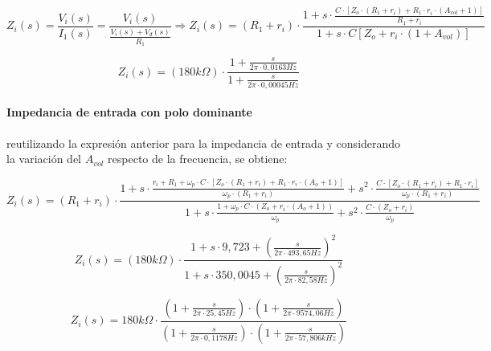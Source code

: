 \begin{equation*}
	Z_i(s) = \frac{V_i(s)}{I_1(s)} = \frac{V_i(s)}{\frac{V_i(s) + V_d(s)}{R_1}}
	\Rightarrow
	Z_i(s) = (R_1 + r_i) \cdot \frac{1 + s \cdot \frac{C \cdot \left[ Z_o \cdot (R_1 + r_i) + R_1 \cdot r_i \cdot (A_{vol} + 1) \right]}{R_1 + r_i}}{1 + s \cdot C \left[ Z_o + r_i \cdot ( 1 + A_{vol}) \right]}
\end{equation*}

\begin{equation}
	Z_i(s) = (180k \Omega) \cdot \frac{1 + \frac{s}{2 \pi \cdot 0,0163Hz}}{1 + \frac{s}{2 \pi \cdot 0,00045Hz}}
	\label{eq:integrador_impedancia_avol_finito}
\end{equation}

\paragraph*{Impedancia de entrada con polo dominante} reutilizando la expresi\'on anterior para la impedancia de entrada y considerando la variaci\'on del $A_{vol}$ respecto de la frecuencia, se obtiene:

\begin{equation*}
	Z_i(s) = (R_1 + r_i) \cdot \frac{1 + s \cdot \frac{r_i + R_1 + \omega_p \cdot C \cdot \left[ Z_o \cdot ( R_1 + r_i ) + R_1 \cdot r_i \cdot (A_o + 1) \right]}{\omega_p \cdot (R_1 +r_i)} + s^{2} \cdot \frac{C \cdot \left[ Z_o \cdot (R_1 + r_i) + R_1 \cdot r_i \right]}{\omega_p \cdot (R_1 + r_i)}}{1 + s \cdot \frac{1 + \omega_p \cdot C \cdot (Z_o + r_i \cdot ( A_o + 1 ) )}{\omega_p} + s^{2} \cdot \frac{C \cdot(Z_o + r_i)}{\omega_p}}
\end{equation*}

\begin{equation*}
	Z_i(s) = (180k \Omega) \cdot \frac{1 + s \cdot 9,723 + \left( \frac{s}{2 \pi \cdot 493,65Hz} \right)^{2}	}{1 + s \cdot 350,0045 + \left(\frac{s}{2 \pi \cdot 82,58Hz} \right)^{2}}
\end{equation*}

\begin{equation}
	Z_i(s) = 180k \Omega \cdot \frac{(1 + \frac{s}{2 \pi \cdot 25,45Hz}) \cdot (1 + \frac{s}{2 \pi \cdot 9574,06Hz})}{(1 + \frac{s}{2 \pi \cdot 0,1178Hz}) \cdot (1 + \frac{s}{2 \pi \cdot 57,806kHz})}
	\label{eq:integrador_impedancia_polo_dominante}
\end{equation}

